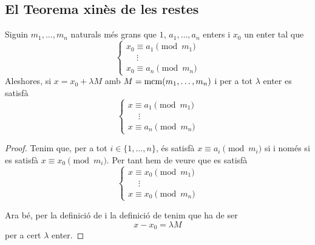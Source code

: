 \documentclass[../../Main.tex]{subfiles}
\begin{document}
	\subsection{El Teorema xinès de les restes}
	\begin{lemma}
		\label{lema:thm:Teorema xinès de les restes}
		Siguin \(m_{1},\dots,m_{n}\) naturals més grans que \(1\), \(a_{1},\dots,a_{n}\) enters i \(x_{0}\) un enter tal que
		\[\begin{cases}
			x_{0}\equiv a_{1}\pmod{m_{1}}\\
			\quad\ \vdots\\
			x_{0}\equiv a_{n}\pmod{m_{n}}
		\end{cases}\]
		Aleshores, si \(x=x_{0}+\lambda M\) amb \(M=\operatorname{mcm}(m_{1},\dots,m_{n})\) i per a tot \(\lambda\) enter es satisfà
		\[\begin{cases}
		x\equiv a_{1}\pmod{m_{1}}\\
		\quad\ \vdots\\
		x\equiv a_{n}\pmod{m_{n}}
		\end{cases}\]
		\begin{proof}
			Tenim que, per a tot \(i\in\{1,\dots,n\}\), és satisfà \(x\equiv a_{i}\pmod{m_{i}}\) si i només si es satisfà \(x\equiv x_{0}\pmod{m_{i}}\). Per tant hem de veure que es satisfà
			\[\begin{cases}
			x\equiv x_{0}\pmod{m_{1}}\\
			\quad\ \vdots\\
			x\equiv x_{0}\pmod{m_{n}}
			\end{cases}\]
			
			Ara bé, per la definició de  i la definició de  tenim que ha de ser
			\[x-x_{0}=\lambda M\]
			per a cert \(\lambda\) enter.
		\end{proof}
	\end{lemma}
\end{document}
